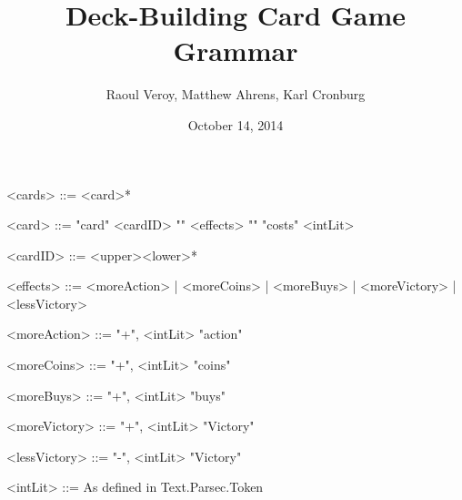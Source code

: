 \documentclass{article}
\title{Deck-Building Card Game Grammar}
\author{Raoul Veroy, Matthew Ahrens, Karl Cronburg}
\date{October 14, 2014}
\begin{document}
\maketitle
\thispagestyle{empty}

\begin{grammar}
<cards> ::= <card>*

<card>        ::= "card" <cardID> "{" <effects> "}" "costs" <intLit>

<cardID>      ::= <upper><lower>*

<effects>     ::= <moreAction> | <moreCoins> | <moreBuys> | <moreVictory>  | <lessVictory>

<moreAction>  ::= "+", <intLit> "action"  

<moreCoins>   ::= "+", <intLit> "coins"  

<moreBuys>    ::= "+", <intLit> "buys"  

<moreVictory> ::= "+", <intLit> "Victory"  

<lessVictory> ::= "-", <intLit> "Victory"  

<intLit>      ::= As defined in Text.Parsec.Token

%
% 
% 
% 
\end{grammar}
\end{document}
